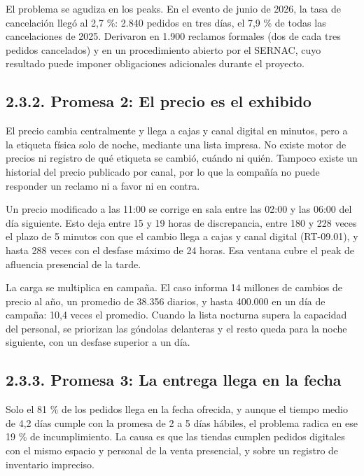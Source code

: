 \documentclass[11pt]{article}
\begin{document}
El problema se agudiza en los peaks. En el evento de junio de 2026, la tasa de cancelación llegó al 2,7 \%: 2.840 pedidos en tres días, el 7,9 \% de todas las cancelaciones de 2025. Derivaron en 1.900 reclamos formales (dos de cada tres pedidos cancelados) y en un procedimiento abierto por el SERNAC, cuyo resultado puede imponer obligaciones adicionales durante el proyecto.

\subsection{2.3.2. Promesa 2: El precio es el exhibido}\label{promesa-2-el-precio-es-el-exhibido}

El precio cambia centralmente y llega a cajas y canal digital en minutos, pero a la etiqueta física solo de noche, mediante una lista impresa. No existe motor de precios ni registro de qué etiqueta se cambió, cuándo ni quién. Tampoco existe un historial del precio publicado por canal, por lo que la compañía no puede responder un reclamo ni a favor ni en contra.

Un precio modificado a las 11:00 se corrige en sala entre las 02:00 y las 06:00 del día siguiente. Esto deja entre 15 y 19 horas de discrepancia, entre 180 y 228 veces el plazo de 5 minutos con que el cambio llega a cajas y canal digital (RT-09.01), y hasta 288 veces con el desfase máximo de 24 horas. Esa ventana cubre el peak de afluencia presencial de la tarde.

La carga se multiplica en campaña. El caso informa 14 millones de cambios de precio al año, un promedio de 38.356 diarios, y hasta 400.000 en un día de campaña: 10,4 veces el promedio. Cuando la lista nocturna supera la capacidad del personal, se priorizan las góndolas delanteras y el resto queda para la noche siguiente, con un desfase superior a un día.

\subsection{2.3.3. Promesa 3: La entrega llega en la fecha}\label{promesa-3-la-entrega-llega-en-la-fecha}

Solo el 81 \% de los pedidos llega en la fecha ofrecida, y aunque el tiempo medio de 4,2 días cumple con la promesa de 2 a 5 días hábiles, el problema radica en ese 19 \% de incumplimiento. La causa es que las tiendas cumplen pedidos digitales con el mismo espacio y personal de la venta presencial, y sobre un registro de inventario impreciso.
\end{document}
